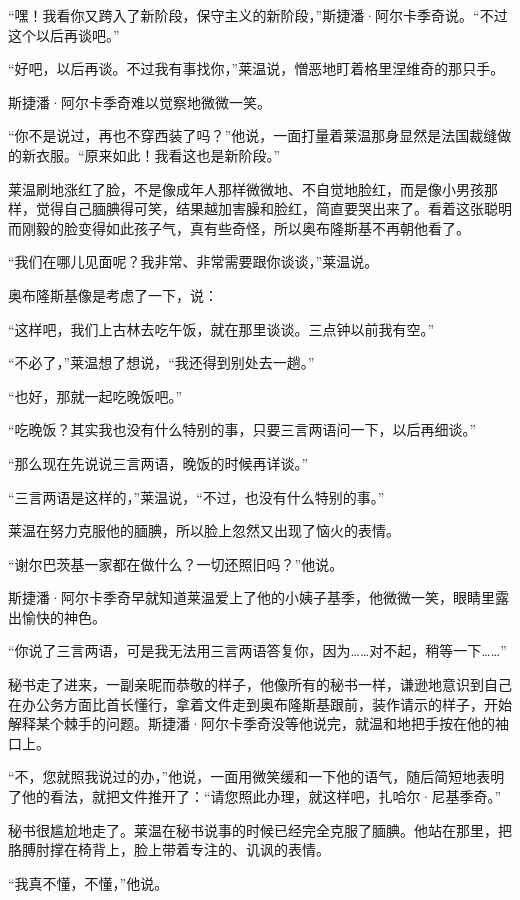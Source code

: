 \par “嘿！我看你又跨入了新阶段，保守主义的新阶段，”斯捷潘·阿尔卡季奇说。“不过这个以后再谈吧。”
\par “好吧，以后再谈。不过我有事找你，”莱温说，憎恶地盯着格里涅维奇的那只手。
\par 斯捷潘·阿尔卡季奇难以觉察地微微一笑。
\par “你不是说过，再也不穿西装了吗？”他说，一面打量着莱温那身显然是法国裁缝做的新衣服。“原来如此！我看这也是新阶段。”
\par 莱温刷地涨红了脸，不是像成年人那样微微地、不自觉地脸红，而是像小男孩那样，觉得自己腼腆得可笑，结果越加害臊和脸红，简直要哭出来了。看着这张聪明而刚毅的脸变得如此孩子气，真有些奇怪，所以奥布隆斯基不再朝他看了。
\par “我们在哪儿见面呢？我非常、非常需要跟你谈谈，”莱温说。
\par 奥布隆斯基像是考虑了一下，说：
\par “这样吧，我们上古林去吃午饭，就在那里谈谈。三点钟以前我有空。”
\par “不必了，”莱温想了想说，“我还得到别处去一趟。”
\par “也好，那就一起吃晚饭吧。”
\par “吃晚饭？其实我也没有什么特别的事，只要三言两语问一下，以后再细谈。”
\par “那么现在先说说三言两语，晚饭的时候再详谈。”
\par “三言两语是这样的，”莱温说，“不过，也没有什么特别的事。”
\par 莱温在努力克服他的腼腆，所以脸上忽然又出现了恼火的表情。
\par “谢尔巴茨基一家都在做什么？一切还照旧吗？”他说。
\par 斯捷潘·阿尔卡季奇早就知道莱温爱上了他的小姨子基季，他微微一笑，眼睛里露出愉快的神色。
\par “你说了三言两语，可是我无法用三言两语答复你，因为……对不起，稍等一下……”
\par 秘书走了进来，一副亲昵而恭敬的样子，他像所有的秘书一样，谦逊地意识到自己在办公务方面比首长懂行，拿着文件走到奥布隆斯基跟前，装作请示的样子，开始解释某个棘手的问题。斯捷潘·阿尔卡季奇没等他说完，就温和地把手按在他的袖口上。
\par “不，您就照我说过的办，”他说，一面用微笑缓和一下他的语气，随后简短地表明了他的看法，就把文件推开了：“请您照此办理，就这样吧，扎哈尔·尼基季奇。”
\par 秘书很尴尬地走了。莱温在秘书说事的时候已经完全克服了腼腆。他站在那里，把胳膊肘撑在椅背上，脸上带着专注的、讥讽的表情。
\par “我真不懂，不懂，”他说。
